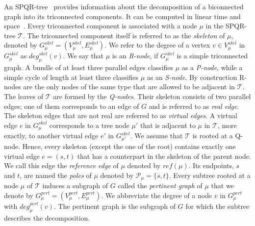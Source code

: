 \documentclass[a4paper,twoside,11pt]{article}
\newcommand{\skel}[1]{G^\textit{skel}_{#1}}
\newcommand{\Vpert}[1]{V^\textit{pert}_{#1}}
\newcommand{\Epert}[1]{E^\textit{pert}_{#1}}
\newcommand{\Vskel}[1]{V^\textit{skel}_{#1}}
\newcommand{\Eskel}[1]{E^\textit{skel}_{#1}}
\newcommand{\pert}[1]{G^\textit{pert}_{#1}}
\newcommand{\pdeg}[2]{\textit{deg}^{\textit{pert}}_{#1}(#2)}
\newcommand{\sdeg}[2]{\textit{deg}^{\textit{skel}}_{#1}(#2)}
\newcommand{\redge}[1]{\textit{ref}(#1)}
\begin{document}
An SPQR-tree~\cite{BT90} provides information about the
decomposition of a biconnected graph into its triconnected
components. It can be computed in linear time and space~\cite{GM00}.
Every triconnected component is associated with a node
$\mu$ in the SPQR-tree $\mathcal{T}$. The triconnected component
itself is referred to as the \emph{skeleton} of $\mu$, denoted by
$\skel{\mu} = (\Vskel{\mu},\Eskel{\mu})$. We refer to the degree of
a vertex $v \in \Vskel{\mu}$ in $\skel{\mu}$ as $\sdeg{\mu}{v}$. We
say that $\mu$ is an \emph{R-node}, if $\skel{\mu}$ is a simple
triconnected graph. A bundle of at least three parallel edges
classifies $\mu$ as a \emph{P-node}, while a simple cycle of length
at least three classifies $\mu$ as an \emph{S-node}. By construction
R-nodes are the only nodes of the same type that are allowed to be
adjacent in $\mathcal{T}$. The leaves of $\mathcal{T}$ are formed by
the \emph{Q-nodes}. Their skeleton consists of two parallel edges;
one of them corresponds to an edge of $G$ and is referred to as
\emph{real edge}. The skeleton edges that are not real are referred
to as \emph{virtual edges}. A virtual edge $e$ in $\skel{\mu}$
corresponds to a tree node $\mu'$ that is adjacent to $\mu$ in
$\mathcal{T}$, more exactly, to another virtual edge $e'$ in
$\skel{\mu'}$. We assume that $\mathcal{T}$ is rooted at a Q-node.
Hence, every skeleton (except the one of the root) contains exactly
one virtual edge $e = (s, t)$ that has a counterpart in the skeleton
of the parent node. We call this edge the \emph{reference edge} of
$\mu$ denoted by $\redge{\mu}$. Its endpoints, $s$ and $t$, are
named the \emph{poles} of $\mu$ denoted by $\mathcal{P}_\mu =
\{s,t\}$. Every subtree rooted at a node $\mu$ of $\mathcal{T}$
induces a subgraph of $G$ called the \emph{pertinent graph} of $\mu$
that we denote by $\pert{\mu} = (\Vpert{\mu}, \Epert{\mu})$. We
abbreviate the degree of a node $v$ in $\pert{\mu}$ with
$\pdeg{\mu}{v}$. The pertinent graph is the subgraph of $G$ for
which the subtree describes the decomposition.
\end{document}
